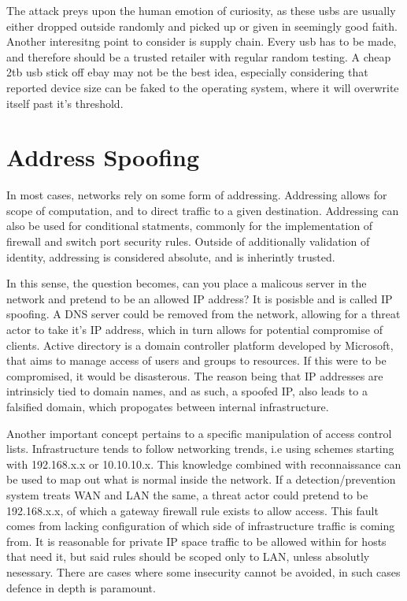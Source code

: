 The attack preys upon the human emotion of curiosity, as these usbs are usually either dropped outside randomly and picked up or given in seemingly good faith. Another interesitng point to consider is supply chain.
Every usb has to be made, and therefore should be a trusted retailer with regular random testing. A cheap 2tb usb stick off ebay may not be the best idea, especially considering that reported device size can be faked to the operating system,
where it will overwrite itself past it's threshold.

\section{Address Spoofing}
In most cases, networks rely on some form of addressing. Addressing allows for scope of computation, and to direct traffic to a given destination. 
Addressing can also be used for conditional statments, commonly for the implementation of firewall and switch port security rules. Outside of additionally validation of identity, addressing
is considered absolute, and is inherintly trusted. \citep{IPMACSpoofing}

In this sense, the question becomes, can you place a malicous server in the network and pretend to be an allowed IP address? It is posisble and is called IP spoofing. A DNS server could be removed from the network, allowing for a threat actor to take it's IP address, 
which in turn allows for potential compromise of clients. Active directory is a domain controller platform developed by Microsoft, that aims to manage access of users and groups to resources. If this were to be compromised, it would be disasterous. 
The reason being that IP addresses are intrinsicly tied to domain names, and as such, a spoofed IP, also leads to a falsified domain, which propogates between internal infrastructure. \citep{DNSSpoofing}

Another important concept pertains to a specific manipulation of access control lists. Infrastructure tends to follow networking trends, i.e using schemes starting with 192.168.x.x or 10.10.10.x. This knowledge combined with reconnaissance can be used to map out what is normal inside the network.
If a detection/prevention system treats WAN and LAN the same, a threat actor could pretend to be 192.168.x.x, of which a gateway firewall rule exists to allow access. This fault comes from lacking configuration of which side of infrastructure traffic is coming from. 
It is reasonable for private IP space traffic to be allowed within for hosts that need it, but said rules should be scoped only to LAN, unless absolutly nesessary. There are cases where some insecurity cannot be avoided, in such cases defence in depth is paramount.

